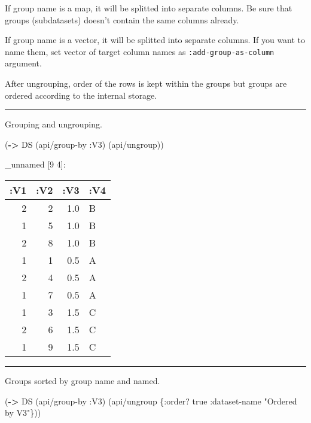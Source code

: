 \documentclass[]{article}
\newenvironment{Shaded}{\begin{snugshade}}{\end{snugshade}}
\newcommand{\KeywordTok}[1]{\textcolor[rgb]{0.13,0.29,0.53}{\textbf{#1}}}
\newcommand{\StringTok}[1]{\textcolor[rgb]{0.31,0.60,0.02}{#1}}
\newcommand{\VariableTok}[1]{\textcolor[rgb]{0.00,0.00,0.00}{#1}}
\newcommand{\AttributeTok}[1]{\textcolor[rgb]{0.77,0.63,0.00}{#1}}
\newcommand{\NormalTok}[1]{#1}
\begin{document}
If group name is a map, it will be splitted into separate columns. Be
sure that groups (subdatasets) doesn't contain the same columns already.

If group name is a vector, it will be splitted into separate columns. If
you want to name them, set vector of target column names as
\texttt{:add-group-as-column} argument.

After ungrouping, order of the rows is kept within the groups but groups
are ordered according to the internal storage.

\begin{center}\rule{0.5\linewidth}{0.5pt}\end{center}

Grouping and ungrouping.

\begin{Shaded}
\begin{Highlighting}[]
\NormalTok{(}\KeywordTok{->}\NormalTok{ DS}
\NormalTok{    (api/group-by }\AttributeTok{:V3}\NormalTok{)}
\NormalTok{    (api/ungroup))}
\end{Highlighting}
\end{Shaded}

\_unnamed {[}9 4{]}:

\begin{longtable}[]{@{}rrrl@{}}
\toprule
:V1 & :V2 & :V3 & :V4\tabularnewline
\midrule
\endhead
2 & 2 & 1.0 & B\tabularnewline
1 & 5 & 1.0 & B\tabularnewline
2 & 8 & 1.0 & B\tabularnewline
1 & 1 & 0.5 & A\tabularnewline
2 & 4 & 0.5 & A\tabularnewline
1 & 7 & 0.5 & A\tabularnewline
1 & 3 & 1.5 & C\tabularnewline
2 & 6 & 1.5 & C\tabularnewline
1 & 9 & 1.5 & C\tabularnewline
\bottomrule
\end{longtable}

\begin{center}\rule{0.5\linewidth}{0.5pt}\end{center}

Groups sorted by group name and named.

\begin{Shaded}
\begin{Highlighting}[]
\NormalTok{(}\KeywordTok{->}\NormalTok{ DS}
\NormalTok{    (api/group-by }\AttributeTok{:V3}\NormalTok{)}
\NormalTok{    (api/ungroup \{}\AttributeTok{:order}\NormalTok{? }\VariableTok{true}
                  \AttributeTok{:dataset-name} \StringTok{"Ordered by V3"}\NormalTok{\}))}
\end{Highlighting}
\end{Shaded}
\end{document}
